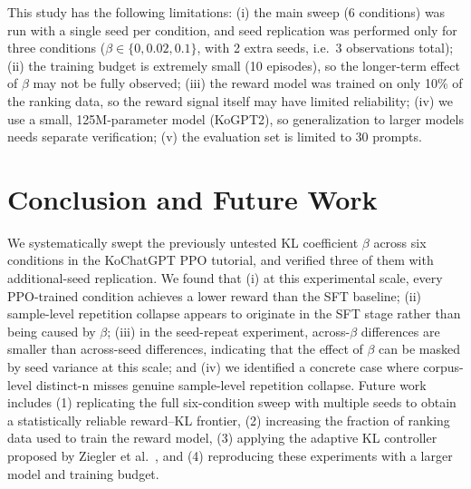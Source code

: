 \documentclass[conference]{IEEEtran}
\begin{document}
This study has the following limitations: (i) the main sweep (6
conditions) was run with a single seed per condition, and seed
replication was performed only for three conditions ($\beta \in \{0,
0.02, 0.1\}$, with 2 extra seeds, i.e.\ 3 observations total); (ii)
the training budget is extremely small (10 episodes), so the
longer-term effect of $\beta$ may not be fully observed; (iii) the
reward model was trained on only 10\% of the ranking data, so the
reward signal itself may have limited reliability; (iv) we use a
small, 125M-parameter model (KoGPT2), so generalization to larger
models needs separate verification; (v) the evaluation set is limited
to 30 prompts.

\section{Conclusion and Future Work}

We systematically swept the previously untested KL coefficient $\beta$
across six conditions in the KoChatGPT PPO tutorial, and verified
three of them with additional-seed replication. We found that (i) at
this experimental scale, every PPO-trained condition achieves a lower
reward than the SFT baseline; (ii) sample-level repetition collapse
appears to originate in the SFT stage rather than being caused by
$\beta$; (iii) in the seed-repeat experiment, across-$\beta$
differences are smaller than across-seed differences, indicating that
the effect of $\beta$ can be masked by seed variance at this scale;
and (iv) we identified a concrete case where corpus-level distinct-n
misses genuine sample-level repetition collapse. Future work includes
(1) replicating the full six-condition sweep with multiple seeds to
obtain a statistically reliable reward--KL frontier, (2) increasing
the fraction of ranking data used to train the reward model, (3)
applying the adaptive KL controller proposed by Ziegler et
al.~\cite{ziegler2019finetuning}, and (4) reproducing these
experiments with a larger model and training budget.



\end{document}

